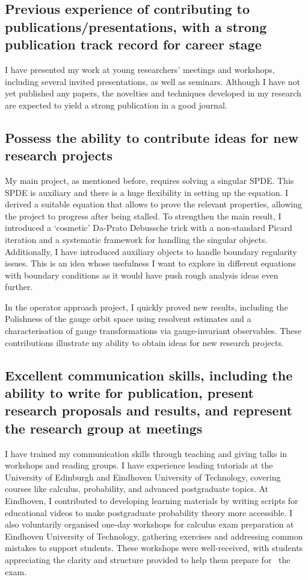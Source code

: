 \documentclass[12pt]{article}
\numberwithin{equation}{section}
\theoremstyle{definition}
\theoremstyle{remark}
\newcommand{\1}{\mathbf 1}
\newcommand{\<}{\langle}
\renewcommand{\>}{\rangle}
\begin{document}
\subsection{Previous experience of contributing to publications/presentations, with a strong publication track record for career stage}
I have presented my work at young researchers' meetings and workshops, including several invited presentations, as well as seminars. Although I have not yet published any papers, the novelties and techniques developed in my research are expected to yield a strong publication in a good journal.

\subsection{Possess the ability to contribute ideas for new research projects}
My main project, as mentioned before, requires solving a singular SPDE. This SPDE is auxiliary and there is a huge flexibility in setting up the equation. I  derived a suitable equation that allows to prove the relevant properties, allowing the project to progress after being stalled. To strengthen the main result, I introduced a `cosmetic' Da-Prato Debussche trick  with a non-standard Picard iteration and  a systematic framework for handling the singular objects. Additionally, I have introduced auxiliary objects to handle boundary regularity issues.  This is an idea whose usefulness I want to explore in different equations with boundary conditions as it would have push rough analysis ideas even further.

In the operator approach project, I quickly proved new results, including the Polishness of the gauge orbit space using resolvent estimates and a characterisation of gauge transformations via gauge-invariant observables. These contributions illustrate my ability to obtain ideas for new research projects.

\subsection{Excellent communication skills, including the ability to write for publication, present research proposals and results, and represent the research group at meetings}

I have trained my communication skills through teaching and giving talks in workshops and reading groups. I have experience leading tutorials at the University of Edinburgh and Eindhoven University of Technology, covering courses like calculus, probability, and advanced postgraduate topics. At Eindhoven, I contributed to developing learning materials by writing scripts for educational videos to make postgraduate probability theory more accessible. I also voluntarily organised one-day workshops for calculus exam preparation at Eindhoven University of Technology, gathering exercises and addressing common mistakes to support students. These workshops were well-received, with students appreciating the clarity and structure provided to help them prepare for  the exam.
\end{document}
